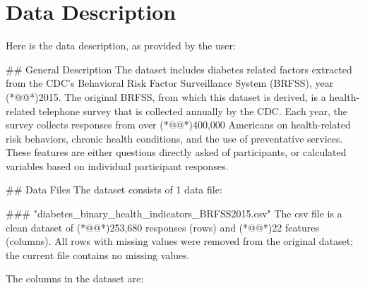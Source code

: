 \documentclass[11pt]{article}
\begin{document}
\clearpage
\appendix

\section{Data Description} \label{sec:data_description} Here is the data description, as provided by the user:

\begin{codeoutput}
\#\# General Description
The dataset includes diabetes related factors extracted from the CDC's Behavioral Risk Factor Surveillance System (BRFSS), year (*@@*)2015.
The original BRFSS, from which this dataset is derived, is a health-related telephone survey that is collected annually by the CDC.
Each year, the survey collects responses from over (*@@*)400,000 Americans on health-related risk behaviors, chronic health conditions, and the use of preventative services. These features are either questions directly asked of participants, or calculated variables based on individual participant responses.

\#\# Data Files
The dataset consists of 1 data file:

\#\#\# "diabetes\_binary\_health\_indicators\_BRFSS2015.csv"
The csv file is a clean dataset of (*@@*)253,680 responses (rows) and (*@@*)22 features (columns).
All rows with missing values were removed from the original dataset; the current file contains no missing values.

The columns in the dataset are:


\end{codeoutput}
\end{document}
